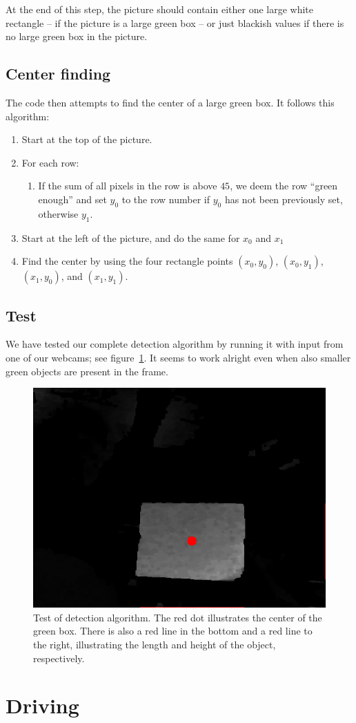\documentclass[a4paper,12pt]{article}
\begin{document}
At the end of this step, the picture should contain either one large white
rectangle -- if the picture is a large green box -- or just blackish values if
there is no large green box in the picture.


\subsection{Center finding}

The code then attempts to find the center of a large green box.  It follows this
algorithm:

\begin{enumerate}
\item Start at the top of the picture.
\item For each row:
\begin{enumerate}
\item If the sum of all pixels in the row is above $45$, we deem the row ``green
enough'' and set $y_0$ to the row number if $y_0$ has not been previously set,
otherwise $y_1$.
\end{enumerate}
\item Start at the left of the picture, and do the same for $x_0$ and $x_1$
\item Find the center by using the four rectangle points $(x_0, y_0)$,
$(x_0, y_1)$, $(x_1, y_0)$, and $(x_1, y_1)$.
\end{enumerate}


\subsection{Test}

We have tested our complete detection algorithm by running it with input from
one of our webcams; see figure~\ref{fig:detect-test}.  It seems to work alright
even when also smaller green objects are present in the frame.

\begin{figure}[h]
\includegraphics[width=.9\textwidth]{test.png}
\caption{Test of detection algorithm.  The red dot illustrates the center of the
green box.  There is also a red line in the bottom and a red line to the right,
illustrating the length and height of the object, respectively.}
\label{fig:detect-test}
\end{figure}


\section{Driving}
\end{document}
